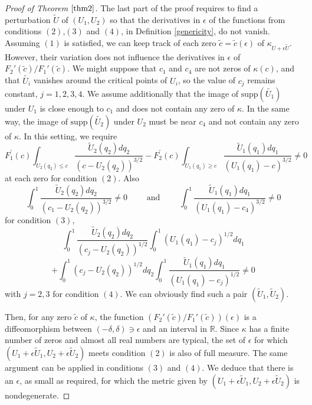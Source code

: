 \documentclass[12pt]{amsart}
\numberwithin{equation}{subsection}
\theoremstyle{definition}
\theoremstyle{plain}
\begin{document}
\begin{proof}[Proof of Theorem $\ref{thm2}$]
The last part of the proof requires to find a perturbation $\tilde{U}$ of $(U_1,U_2)$ so that
the derivatives in $\epsilon$ of the functions from conditions $(2)$,$(3)$ and $(4)$, in
Definition \ref{genericity}, do not vanish.
Assuming
$(1)$ is satisfied, we can keep track of each zero $\tilde{c}=\tilde{c}(\epsilon)$ of $\kappa_{U+ \epsilon \tilde{U}}$.
However, their variation does not influence the derivatives in $\epsilon$ of ${F_{2}}'(\tilde{c})/{F_{1}}'(\tilde{c})$.
We might suppose that $c_1$ and $c_4$ are not zeros of $\kappa(c)$, and that $\tilde{U_i}$ vanishes around the critical points of $U_i$, so
the value of $c_j$ remains constant, $j=1,2,3,4$.
We assume additionally that
the image of $ \text{supp}(\tilde{U_1})$ under $U_1$ is close
enough to $c_1$ and does not contain any zero of $\kappa$. In the same way, the image of $ \text{supp}(\tilde{U_2})$ under $U_2$ must be near $c_4$ and not contain any zero of $\kappa$.
In this setting, we require
\[
F_1^{'}(c)
\int_{U_2(q_2) \leq c} \frac{\tilde{U}_2(q_2) dq_2}{(c-U_2(q_2))^{3/2}}
-
F_2^{'}(c)
\int_{U_1(q_1) \geq c} \frac{\tilde{U}_1(q_1) dq_1}{(U_1(q_1)-c)^{3/2}}
\neq 0
\]
at each zero for condition $(2)$.
Also
\[
\int_0^1 \frac{\tilde{U}_2(q_2) dq_2}{(c_1-U_2(q_2))^{3/2}} \neq 0 \qquad \text{ and } \qquad
\int_0^1 \frac{\tilde{U}_1(q_1) dq_1}{(U_1(q_1)-c_4)^{3/2}}\neq 0
\]
for condition $(3)$,
\[
\int_0^1 \frac{\tilde{U}_2(q_2) dq_2}{(c_j-U_2(q_2))^{1/2}} \int_0^1 (U_1(q_1)-c_j)^{1/2} dq_1
\]
\[
+
\int_0^1 (c_j-U_2(q_2))^{1/2} dq_2 \int_0^1 \frac{\tilde{U}_1(q_1) dq_1}{(U_1(q_1)-c_j)^{1/2}}
\neq 0
\]
with $j=2,3$ for condition $(4)$. We can obviously find such a pair $(\tilde{U}_1,\tilde{U}_2)$.

Then, for any zero $\tilde{c}$ of $\kappa$, the function $\left({F_{2}}'(\tilde{c})/{F_{1}}'(\tilde{c})\right)(\epsilon)$ is a diffeomorphism between $(-\delta,\delta) \ni \epsilon$
and an interval in $\mathbb{R}$.
Since $\kappa$ has a finite number of zeros and almost all real numbers are typical, the set of $\epsilon$ for which $(U_1+\epsilon \tilde{U}_1,U_2+\epsilon \tilde{U}_2)$ meets condition $(2)$ is also
of full measure. The same argument can be applied in conditions $(3)$ and $(4)$.
We deduce that there is an $\epsilon$, as small as required, for which the metric given by $(U_1+\epsilon \tilde{U}_1,U_2+\epsilon \tilde{U}_2)$ is nondegenerate.
\end{proof}
\end{document}
